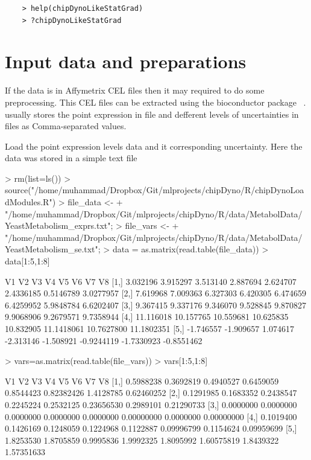 \documentclass{article}
\begin{document}
\begin{verbatim}
    > help(chipDynoLikeStatGrad)
    > ?chipDynoLikeStatGrad
\end{verbatim}


\section{Input data and preparations}
If the data is in Affymetrix CEL files then it may required to do some preprocessing. This CEL files can be extracted using the bioconductor package  ~\cite{puma}.  usually stores the point expression in  file and defferent levels of uncertainties in  files as Comma-separated values.

Load the point expression levels data and it corresponding uncertainty. Here the data was stored in a simple text file %

\begin{Schunk}
\begin{Sinput}
> rm(list=ls())
> source("/home/muhammad/Dropbox/Git/mlprojects/chipDyno/R/chipDynoLoadModules.R")
> file_data <- 
+   "/home/muhammad/Dropbox/Git/mlprojects/chipDyno/R/data/MetabolData/YeastMetabolism_exprs.txt";
> file_vars <- 
+   "/home/muhammad/Dropbox/Git/mlprojects/chipDyno/R/data/MetabolData/YeastMetabolism_se.txt";
> data = as.matrix(read.table(file_data))
> data[1:5,1:8]
\end{Sinput}
\begin{Soutput}
            V1        V2        V3        V4        V5         V6         V7         V8
[1,]  3.032196  3.915297  3.513140  2.887694  2.624707  2.4336185  0.5146789  3.0277957
[2,]  7.619968  7.009363  6.327303  6.420305  6.474659  6.4259952  5.9848784  6.6202407
[3,]  9.367415  9.337176  9.346070  9.528845  9.870827  9.9068906  9.2679571  9.7358944
[4,] 11.116018 10.157765 10.559681 10.625835 10.832905 11.1418061 10.7627800 11.1802351
[5,] -1.746557 -1.909657  1.074617 -2.313146 -1.508921 -0.9244119 -1.7330923 -0.8551462
\end{Soutput}
\begin{Sinput}
> vars=as.matrix(read.table(file_vars))
> vars[1:5,1:8]
\end{Sinput}
\begin{Soutput}
            V1        V2        V3        V4        V5         V6        V7         V8
[1,] 0.5988238 0.3692819 0.4940527 0.6459059 0.8544423 0.82382426 1.4128785 0.62460252
[2,] 0.1291985 0.1683352 0.2438547 0.2245224 0.2532125 0.23656530 0.2989101 0.21290733
[3,] 0.0000000 0.0000000 0.0000000 0.0000000 0.0000000 0.00000000 0.0000000 0.00000000
[4,] 0.1019400 0.1426169 0.1248059 0.1224968 0.1122887 0.09996799 0.1154624 0.09959699
[5,] 1.8253530 1.8705859 0.9995836 1.9992325 1.8095992 1.60575819 1.8439322 1.57351633
\end{Soutput}
\end{Schunk}
\end{document}
